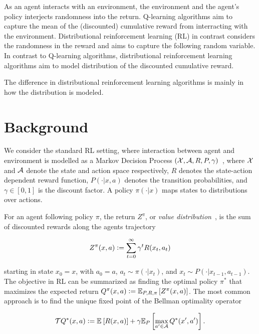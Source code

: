 \documentclass[twoside]{article}
\begin{document}

As an agent interacts with an environment, the environment and the agent's
policy interjects randomness into the return. Q-learning algorithms aim to
capture the mean of the (discounted) cumulative reward from interracting
with the environment. Distributional reinforcement learning (RL) in contrast
considers the randomness in the reward and aims to capture the following random
variable. In contrast to Q-learning algorithms, distributional reinforcement
learning algorithms aim to model distribution of the discounted cumulative
reward.

The difference in distributional reinforcement learning algorithms is mainly in
how the distribution is modeled.

\section{Background}

We consider the standard RL setting, where interaction between agent and
environment is modelled as a Markov Decision Process
\((\mathcal{X}, \mathcal{A}, R, P, \gamma)\)~\citep{puterman94}, where \(\mathcal{X}\) and \(\mathcal{A}\) denote
the state and action space respectively, \(R\) denotes the state-action
dependent reward function, \(P(\cdot \vert x, a)\) denotes the transition
probabilities, and \(\gamma \in [0,1]\) is the discount factor. A policy
\(\pi(\cdot \vert x)\) maps states to distributions over actions.

For an agent following policy \(\pi\), the return \(Z^\pi\),
or \emph{value distribution}~\citep{bellmare17}, is the sum of
discounted rewards along the agents trajectory

\begin{equation}
  Z^\pi(x, a) \vcentcolon= \sum_{t=0}^\infty{\gamma^t R(x_t,a_t)}
\end{equation}

\noindent
starting in state \(x_0 = x\), with \(a_0 = a\), \(a_t \sim \pi(\cdot \vert
x_t)\), and \(x_t \sim P(\cdot \vert x_{t-1}, a_{t-1})\).
The objective in RL can be summarized as finding the optimal policy \(\pi^*\)
that maximizes the expected return \(Q^\pi(x, a) \vcentcolon= \mathbb{E}_{P, R, \pi} \left[ Z^\pi(x, a) \right]
\). The most common approach is to find the unique fixed point of the Bellman
optimality operator~\citep{bellman57}

\begin{equation}
  \mathcal{T} Q^*(x, a) \vcentcolon= \mathbb{E}_{} \left[ R(x, a) \right] + \gamma \mathbb{E}_{P} \left[ \max_{a^\prime \in \mathcal{A}}
    Q^*(x^\prime, a^\prime) \right].
\end{equation}
\end{document}
